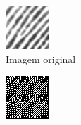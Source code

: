 \documentclass[10pt,a4paper]{article}
\begin{document}
\begin{figure}[!ht]
    \centering
    \begin{subfigure}[ht]{0.20\textwidth}
        \includegraphics[width=\textwidth]{1.jpg}
        \caption{Imagem original}
    \end{subfigure}
    \qquad
    \begin{subfigure}[ht]{0.20\textwidth}
        \includegraphics[width=\textwidth]{1_filtered_window_3.jpg}

\end{subfigure}
\end{figure}
\end{document}
